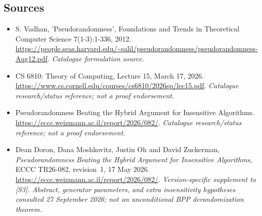 \documentclass[11pt,a4paper]{article}
\numberwithin{equation}{section}
\begin{document}
\subsection{Sources}
\begin{itemize}\raggedright
\item[\textnormal{[S1]}]\hypertarget{source:3405:1}{} S. Vadhan, 'Pseudorandomness', Foundations and Trends in Theoretical Computer Science 7(1-3):1-336, 2012.
\url{https://people.seas.harvard.edu/~salil/pseudorandomness/pseudorandomness-Aug12.pdf}.
{\small\textit{Catalogue formulation source.}}
\item[\textnormal{[S2]}]\hypertarget{source:3405:2}{} CS 6810: Theory of Computing, Lecture 15, March 17, 2026.
\url{https://www.cs.cornell.edu/courses/cs6810/2026sp/lec15.pdf}.
{\small\textit{Catalogue research/status reference; not a proof endorsement.}}
\item[\textnormal{[S3]}]\hypertarget{source:3405:3}{} Pseudorandomness Beating the Hybrid Argument for Insensitive Algorithms.
\url{https://eccc.weizmann.ac.il/report/2026/082/}.
{\small\textit{Catalogue research/status reference; not a proof endorsement.}}
\item[\textnormal{[E1]}]\hypertarget{extra:3405:1}{} Dean Doron, Dana Moshkovitz,
Justin Oh and David Zuckerman, \emph{Pseudorandomness Beating the Hybrid
Argument for Insensitive Algorithms}, ECCC TR26-082, revision~1,
17 May 2026.
\url{https://eccc.weizmann.ac.il/report/2026/082/}.
{\small\textit{Version-specific supplement to [S3]. Abstract, generator
parameters, and extra insensitivity hypotheses consulted 27 September 2026;
not an unconditional BPP derandomization theorem.}}

\end{itemize}

\end{document}
